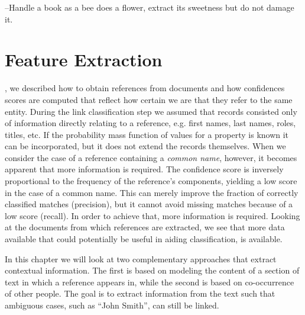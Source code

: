 \begin{savequote}[75mm] 
--Handle a book as a bee does a flower, extract its sweetness but do not damage it.
\end{savequote}




\chapter{Feature Extraction}
\label{ch:feature_extraction}

, we described how to obtain references from documents and how confidences scores are computed that reflect how certain we are that they refer to the same entity.
During the link classification step we assumed that records consisted only of information directly relating to a reference, e.g. first names, last names, roles, titles, etc.
If the probability mass function of values for a property is known it can be incorporated, but it does not extend the records themselves.
When we consider the case of a reference containing a \emph{common name}, however, it becomes apparent that more information is required.
The confidence score is inversely proportional to the frequency of the reference's components, yielding a low score in the case of a common name.
This can merely improve the fraction of correctly classified matches (precision), but it cannot avoid missing matches because of a low score (recall).
In order to achieve that, more information is required.
Looking at the documents from which references are extracted, we see that more data available that could potentially be useful in aiding classification, is available.

In this chapter we will look at two complementary approaches that extract contextual information.
The first is based on modeling the content of a section of text in which a reference appears in, while the second is based on co-occurrence of other people.
The goal is to extract information from the text such that ambiguous cases, such as ``John Smith'', can still be linked.





